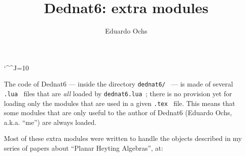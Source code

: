 \documentclass[oneside]{article}
\begin{document}
\catcode`\^^J=10

\def\co#1{{%
  \def\%{\char37}%
  \def\\{\char92}%
  \def\^{\char94}%
  \def\~{\char126}%
  \tt#1%
  }}
\def\qco#1{`\co{#1}'}
\def\qqco#1{``\co{#1}''}

\def\bsk{\bigskip}
\def\msk{\medskip}
\def\ssk{\smallskip}

\def\defzha#1#2{\expandafter\def\csname zha-#1\endcsname{#2}}
\def\ifzhaundefined#1{\expandafter\ifx\csname zha-#1\endcsname\relax}
\def\zha#1{\ifzhaundefined{#1}
    \errmessage{UNDEFINED ZHA: #1}
  \else
    \csname zha-#1\endcsname
  \fi
}
\def\deftcg#1#2{\expandafter\def\csname tcg-#1\endcsname{#2}}
\def\iftcgundefined#1{\expandafter\ifx\csname tcg-#1\endcsname\relax}
\def\tcg#1{\iftcgundefined{#1}
    \errmessage{UNDEFINED TCG: #1}
  \else
    \csname tcg-#1\endcsname
  \fi
}
\def\defub#1#2{\expandafter\def\csname ub-#1\endcsname{#2}}
\def\ifubundefined#1{\expandafter\ifx\csname ub-#1\endcsname\relax}
\def\ub#1{\ifubundefined{#1}
    \errmessage{UNDEFINED UB: #1}
  \else
    \csname ub-#1\endcsname
  \fi
}
\def\und#1#2{\underbrace{#1}_{#2}}




\title{Dednat6: extra modules}

\author{Eduardo Ochs}

\maketitle






The code of Dednat6 --- inside the directory \co{dednat6/} --- is made
of several \co{.lua} files that are {\sl all} loaded by
\co{dednat6.lua}; there is no provision yet for loading only the
modules that are used in a given \co{.tex} file. This means that some
modules that are only useful to the author of Dednat6 (Eduardo Ochs,
a.k.a. ``me'') are always loaded.

Most of these extra modules were written to handle the objects
described in my series of papers about ``Planar Heyting Algebras'',
at:
\end{document}
